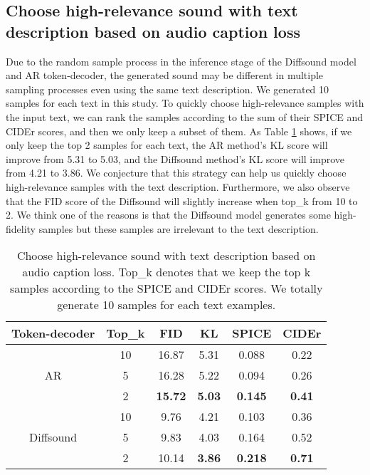 \documentclass[lettersize,journal]{IEEEtran}
\begin{document}
\subsection{Choose high-relevance sound with text description based on audio caption loss}
Due to the random sample process in the inference stage of the Diffsound model and AR token-decoder, the generated sound may be different in multiple sampling processes even using the same text description. We generated 10 samples for each text in this study. To quickly choose high-relevance samples with the input text, we can rank the samples according to the sum of their SPICE and CIDEr scores, and then we only keep a subset of them. As Table \ref{tab:my-table7} shows, if we only keep the top 2 samples for each text, the AR method's KL score will improve from 5.31 to 5.03, and the Diffsound method's KL score will improve from 4.21 to 3.86. We conjecture that this strategy can help us quickly choose high-relevance samples with the text description. Furthermore, we also observe that the FID score of the Diffsound will slightly increase when top\_k from 10 to 2. We think one of the reasons is that the Diffsound model generates some high-fidelity samples but these samples are irrelevant to the text description.
\begin{table}[t] \centering
\caption{Choose high-relevance sound with text description based on audio caption loss. Top\_k denotes that we keep the top k samples according to the SPICE and CIDEr scores. We totally generate 10 samples for each text examples.}
\label{tab:my-table7}
\begin{tabular}{cccccc}
\hline
Token-decoder     & Top\_k & FID & KL & SPICE & CIDEr \\ \hline
\multicolumn{1}{c|}{\multirow{3}{*}{AR}}        & 10     & 16.87 & 5.31 & 0.088 & 0.22  \\
\multicolumn{1}{c|}{}                           & 5      & 16.28 & 5.22 & 0.094 & 0.26  \\
\multicolumn{1}{c|}{}                           & 2       & \textbf{15.72}     & \textbf{5.03}    & \textbf{0.145}    & \textbf{0.41}  \\ \hline
\multicolumn{1}{c|}{\multirow{3}{*}{Diffsound}} & 10     & 9.76  & 4.21 & 0.103 & 0.36  \\
\multicolumn{1}{c|}{}                           & 5      & 9.83  & 4.03 & 0.164 & 0.52  \\
\multicolumn{1}{c|}{}                           & 2     & 10.14   & \textbf{3.86}   & \textbf{0.218}      & \textbf{0.71}   \\ \hline
\end{tabular}
\end{table}
\end{document}
